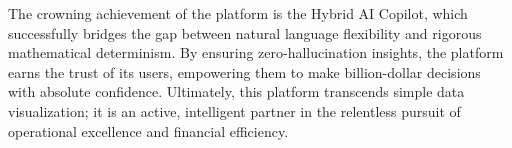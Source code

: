 \documentclass[11pt,a4paper]{article}
\begin{document}
The crowning achievement of the platform is the Hybrid AI Copilot, which successfully bridges the gap between natural language flexibility and rigorous mathematical determinism. By ensuring zero-hallucination insights, the platform earns the trust of its users, empowering them to make billion-dollar decisions with absolute confidence. Ultimately, this platform transcends simple data visualization; it is an active, intelligent partner in the relentless pursuit of operational excellence and financial efficiency.
\end{document}
